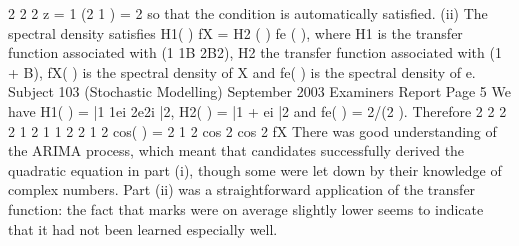 2 2 2
z = 1 (2 1 ) = 2
so that the condition is automatically satisfied.
(ii) The spectral density satisfies
H1( ) fX = H2 ( ) fe ( ),
where H1 is the transfer function associated with (1 1B 2B2), H2 the
transfer function associated with (1 + B), fX( ) is the spectral density of X
and fe( ) is the spectral density of e.
Subject 103 (Stochastic Modelling) September 2003 Examiners Report
Page 5
We have
H1( ) = |1 1ei
2e2i |2, H2( ) = |1 + ei |2 and fe( ) = 2/(2 ).
Therefore
2 2
2 2
1 2 1 1 2 2
1 2 cos( )
=
2 1 2 cos 2 cos 2
fX
There was good understanding of the ARIMA process, which meant that candidates
successfully derived the quadratic equation in part (i), though some were let down by their
knowledge of complex numbers. Part (ii) was a straightforward application of the transfer
function: the fact that marks were on average slightly lower seems to indicate that it had not
been learned especially well.
